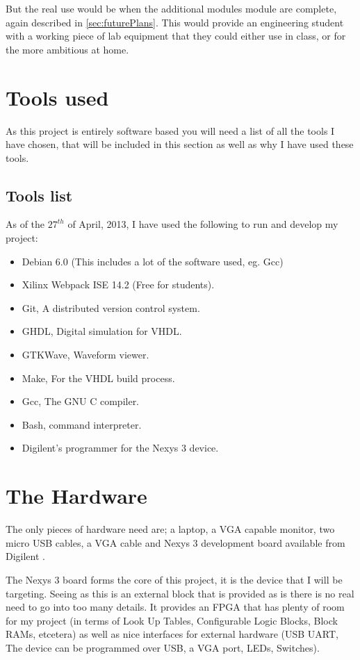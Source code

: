 \documentclass	[a4paper, 10pt]	{article}
\begin{document}
    But the real use would be when the additional modules module are complete, again
    described in \ref{sec:futurePlans}. This would provide an engineering student
    with a working piece of lab equipment that they could either use in class, or for
    the more ambitious at home.

  \section{Tools used}
  
  As this project is entirely software based you will need a list of all the tools
  I have chosen, that will be included in this section as well as why I have used
  these tools.

    \subsection{Tools list}

    As of the $27^{th}$ of April, 2013, I have used the following to run and develop
    my project:

    \begin{itemize}
      \item Debian 6.0 (This includes a lot of the software used, eg. Gcc)
      \item Xilinx Webpack ISE 14.2 (Free for students).
      \item Git, A distributed version control system.
      \item GHDL, Digital simulation for VHDL.
      \item GTKWave, Waveform viewer.
      \item Make, For the VHDL build process.
      \item Gcc, The GNU C compiler.
      \item Bash, command interpreter.
      \item Digilent's programmer for the Nexys 3 device.
    \end{itemize}


  \section{The Hardware}

  The only pieces of hardware need are; a laptop, a VGA capable monitor, two micro USB cables,
  a VGA cable and Nexys 3 development board available from Digilent \cite{nexysDigilent}.

  The Nexys 3 board forms the core of this project, it is the device that I will be targeting.
  Seeing as this is an external block that is provided as is there is no real need to go into
  too many details. It provides an FPGA that has plenty of room for my project (in terms of
  Look Up Tables, Configurable Logic Blocks, Block RAMs, etcetera) as well as nice interfaces
  for external hardware (USB UART, The device can be programmed over USB, a VGA port, LEDs,
  Switches).
\end{document}
